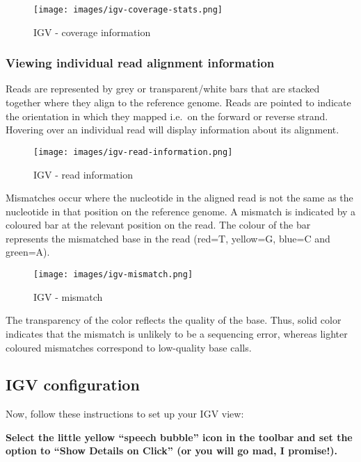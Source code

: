 \documentclass[11pt]{article}
\begin{document}
    \begin{figure}
\centering
\texttt{[image: images/igv-coverage-stats.png]}
\caption{IGV - coverage information}
\end{figure}

    \hypertarget{viewing-individual-read-alignment-information}{%
\subsubsection{Viewing individual read alignment
information}\label{viewing-individual-read-alignment-information}}

Reads are represented by grey or transparent/white bars that are stacked
together where they align to the reference genome. Reads are pointed to
indicate the orientation in which they mapped i.e.~on the forward or
reverse strand. Hovering over an individual read will display
information about its alignment.

    \begin{figure}
\centering
\texttt{[image: images/igv-read-information.png]}
\caption{IGV - read information}
\end{figure}

Mismatches occur where the nucleotide in the aligned read is not the
same as the nucleotide in that position on the reference genome. A
mismatch is indicated by a coloured bar at the relevant position on the
read. The colour of the bar represents the mismatched base in the read
(red=T, yellow=G, blue=C and green=A).

    \begin{figure}
\centering
\texttt{[image: images/igv-mismatch.png]}
\caption{IGV - mismatch}
\end{figure}

The transparency of the color reflects the quality of the base. Thus, 
solid color indicates that the mismatch is unlikely to be a sequencing error, 
whereas lighter coloured mismatches correspond to low-quality base calls.

    \hypertarget{igv-configuration}{%
\subsection{IGV configuration}\label{igv-configuration}}

Now, follow these instructions to set up your IGV view:

\textbf{Select the little yellow ``speech bubble'' icon in the toolbar
and set the option to ``Show Details on Click'' (or you will go mad, I
promise!).}
\end{document}

